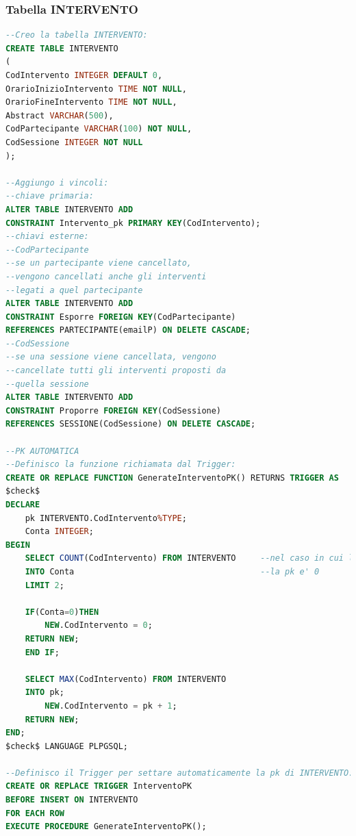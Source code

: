 \documentclass[a4page]{article}
\begin{document}
\subsubsection{Tabella INTERVENTO}
\begin{lstlisting}[language=SQL,
        deletekeywords={IDENTITY,INT},
        morekeywords={clustered},    
        framesep=10pt,
        framextopmargin=10pt]
--Creo la tabella INTERVENTO: 
CREATE TABLE INTERVENTO
(
CodIntervento INTEGER DEFAULT 0,
OrarioInizioIntervento TIME NOT NULL,
OrarioFineIntervento TIME NOT NULL,
Abstract VARCHAR(500),
CodPartecipante VARCHAR(100) NOT NULL,
CodSessione INTEGER NOT NULL
);

--Aggiungo i vincoli:
--chiave primaria:
ALTER TABLE INTERVENTO ADD 
CONSTRAINT Intervento_pk PRIMARY KEY(CodIntervento);
--chiavi esterne:
--CodPartecipante
--se un partecipante viene cancellato,
--vengono cancellati anche gli interventi
--legati a quel partecipante
ALTER TABLE INTERVENTO ADD 
CONSTRAINT Esporre FOREIGN KEY(CodPartecipante)
REFERENCES PARTECIPANTE(emailP) ON DELETE CASCADE;
--CodSessione
--se una sessione viene cancellata, vengono
--cancellate tutti gli interventi proposti da
--quella sessione
ALTER TABLE INTERVENTO ADD 
CONSTRAINT Proporre FOREIGN KEY(CodSessione)
REFERENCES SESSIONE(CodSessione) ON DELETE CASCADE;

--PK AUTOMATICA
--Definisco la funzione richiamata dal Trigger:
CREATE OR REPLACE FUNCTION GenerateInterventoPK() RETURNS TRIGGER AS
$check$
DECLARE
	pk INTERVENTO.CodIntervento%TYPE;
	Conta INTEGER;
BEGIN
	SELECT COUNT(CodIntervento) FROM INTERVENTO		--nel caso in cui la tabella sia vuota
	INTO Conta										--la pk e' 0
	LIMIT 2;
	
	IF(Conta=0)THEN				
		NEW.CodIntervento = 0;	
	RETURN NEW;
	END IF;
	
	SELECT MAX(CodIntervento) FROM INTERVENTO
	INTO pk;
		NEW.CodIntervento = pk + 1;
	RETURN NEW;
END;
$check$ LANGUAGE PLPGSQL;

--Definisco il Trigger per settare automaticamente la pk di INTERVENTO:
CREATE OR REPLACE TRIGGER InterventoPK
BEFORE INSERT ON INTERVENTO
FOR EACH ROW
EXECUTE PROCEDURE GenerateInterventoPK();        

\end{lstlisting}
\end{document}
